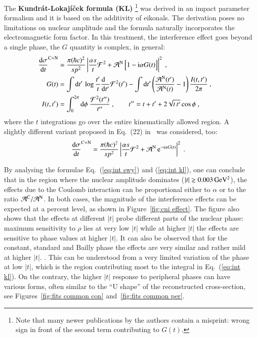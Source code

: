 The {\bf Kundr\' at-Lokaj\' i\v cek formula (KL)} \cite{kl94}\footnote{%
Note that many newer publications by the authors contain a misprint: wrong sign in front of the second term contributing to $G(t)$.
} was derived in an impact parameter formalism and it is based on the additivity of eikonals. The derivation poses no limitations on nuclear amplitude and the formula naturally incorporates the electromagnetic form factor. In this treatment, the interference effect goes beyond a single phase, the $G$ quantity is complex, in general:
\begin{equation}
\label{eq:int kl}
	\begin{aligned}
		{\d\sigma\over \d t}^{\rm C+N} &= {\pi (\hbar c)^2 \over s p^2} \left | {\alpha s\over t} {\cal F}^2
			+ {\cal A}^{\rm N}\, \Big[1 - \I\alpha G(t)\Big] \right |^2\ ,\cr
		G(t) &= 
			\int \d t'\, \log {t'\over t} {\d\phantom{t'}\over \d t'} {\cal F}^2(t')
			- \int \d t' \left( {{\cal A}^{\rm N}(t') \over {\cal A}^{\rm N}(t)} - 1 \right) { I(t, t')\over 2\pi }
			\ ,\cr
		I(t, t') &= \int_0^{2\pi} \d\phi\ {{\cal F}^2(t'')\over t''}\ ,\qquad t'' = t + t' + 2\sqrt{t\, t'} \cos\phi\ ,\cr
	\end{aligned}
\end{equation}
where the $t$ integrations go over the entire kinematically allowed region. A slightly different variant proposed in Eq.~(22) in~\cite{kl05} was considered, too:
\begin{equation}
\label{eq:int kl exp}
	{\d\sigma\over \d t}^{\rm C+N} = {\pi (\hbar c)^2 \over s p^2} \left | {\alpha s\over t} {\cal F}^2
		+ {\cal A}^{\rm N}\, \e^{- \I\alpha G(t)} \right |^2 \ .
\end{equation}

By analysing the formulae Eq.~(\ref{eq:int swy}) and (\ref{eq:int kl}), one can conclude that in the region where the nuclear amplitude dominates ($|t| \gtrsim 0.003\,{\rm GeV^2}$), the effects due to the Coulomb interaction can be proportional either to $\alpha$ or to the ratio ${\cal A}^{\rm C} / {\cal A}^{\rm N}$. In both cases, the magnitude of the interference effects can be expected at a percent level, as shown in Figure~\ref{fig:cni effect}. The figure also shows that the effects at different $|t|$ probe different parts of the nuclear phase: maximum sensitivity to $\rho$ lies at very low $|t|$ while at higher $|t|$ the effects are sensitive to phase values at higher $|t|$. It can also be observed that for the constant, standard and Bailly phase the effects are very similar and rather mild at higher $|t|$. . This can be understood from a very limited variation of the phase at low $|t|$, which is the region contributing most to the integral in Eq.~(\ref{eq:int kl}). On the contrary, the higher $|t|$ response to peripheral phases can have various forms, often similar to the ``U shape'' of the reconstructed cross-section, see Figures~\ref{fig:fits common con} and~\ref{fig:fits common per}. 


